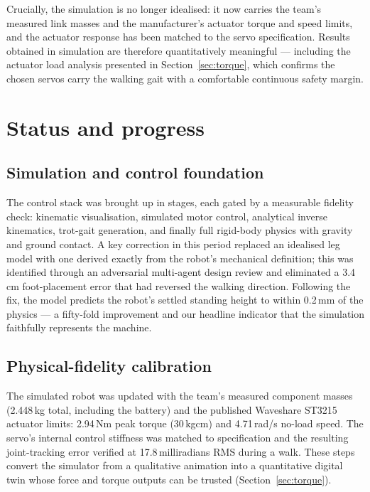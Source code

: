 \documentclass[11pt,a4paper]{article}
\newcommand{\nm}{\,N\textperiodcentered m}
\begin{document}
Crucially, the simulation is no longer idealised: it now carries the team's measured link masses
and the manufacturer's actuator torque and speed limits, and the actuator response has been matched
to the servo specification. Results obtained in simulation are therefore quantitatively meaningful
--- including the actuator load analysis presented in Section~\ref{sec:torque}, which confirms the
chosen servos carry the walking gait with a comfortable continuous safety margin.

\section{Status and progress}

\subsection{Simulation and control foundation}
The control stack was brought up in stages, each gated by a measurable fidelity check: kinematic
visualisation, simulated motor control, analytical inverse kinematics, trot-gait generation, and
finally full rigid-body physics with gravity and ground contact. A key correction in this period
replaced an idealised leg model with one derived exactly from the robot's mechanical definition;
this was identified through an adversarial multi-agent design review and eliminated a 3.4\,cm
foot-placement error that had reversed the walking direction. Following the fix, the model predicts
the robot's settled standing height to within 0.2\,mm of the physics --- a fifty-fold improvement
and our headline indicator that the simulation faithfully represents the machine.

\subsection{Physical-fidelity calibration}
The simulated robot was updated with the team's measured component masses (2.448\,kg total,
including the battery) and the published Waveshare ST3215 actuator limits: 2.94\nm{} peak torque
(30\,kg\textperiodcentered cm) and 4.71\,rad/s no-load speed. The servo's internal control
stiffness was matched to specification and the resulting joint-tracking error verified at
17.8\,milliradians RMS during a walk. These steps convert the simulator from a qualitative
animation into a quantitative digital twin whose force and torque outputs can be trusted
(Section~\ref{sec:torque}).
\end{document}
